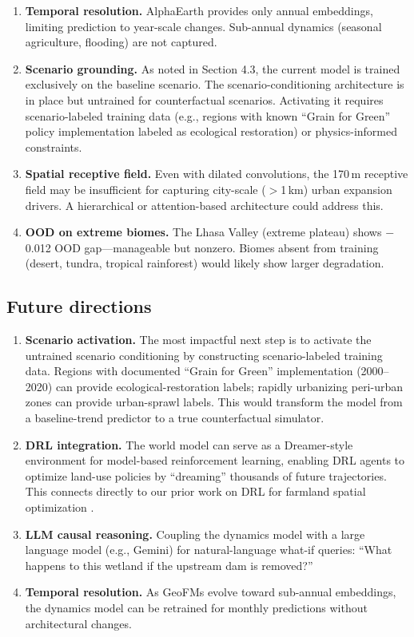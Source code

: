 \documentclass{article}
\begin{document}
\begin{enumerate}
\item \textbf{Temporal resolution.} AlphaEarth provides only annual embeddings, limiting prediction to year-scale changes. Sub-annual dynamics (seasonal agriculture, flooding) are not captured.

\item \textbf{Scenario grounding.} As noted in Section 4.3, the current model is trained exclusively on the baseline scenario. The scenario-conditioning architecture is in place but untrained for counterfactual scenarios. Activating it requires scenario-labeled training data (e.g., regions with known ``Grain for Green'' policy implementation labeled as ecological restoration) or physics-informed constraints.

\item \textbf{Spatial receptive field.} Even with dilated convolutions, the 170\,m receptive field may be insufficient for capturing city-scale ($>$1\,km) urban expansion drivers. A hierarchical or attention-based architecture could address this.

\item \textbf{OOD on extreme biomes.} The Lhasa Valley (extreme plateau) shows $-$0.012 OOD gap---manageable but nonzero. Biomes absent from training (desert, tundra, tropical rainforest) would likely show larger degradation.
\end{enumerate}

\subsection{Future directions}
\label{sec:future}

\begin{enumerate}
\item \textbf{Scenario activation.} The most impactful next step is to activate the untrained scenario conditioning by constructing scenario-labeled training data. Regions with documented ``Grain for Green'' implementation (2000--2020) can provide ecological-restoration labels; rapidly urbanizing peri-urban zones can provide urban-sprawl labels. This would transform the model from a baseline-trend predictor to a true counterfactual simulator.

\item \textbf{DRL integration.} The world model can serve as a Dreamer-style environment for model-based reinforcement learning, enabling DRL agents to optimize land-use policies by ``dreaming'' thousands of future trajectories. This connects directly to our prior work on DRL for farmland spatial optimization \citep{zhou2026drl}.

\item \textbf{LLM causal reasoning.} Coupling the dynamics model with a large language model (e.g., Gemini) for natural-language what-if queries: ``What happens to this wetland if the upstream dam is removed?''

\item \textbf{Temporal resolution.} As GeoFMs evolve toward sub-annual embeddings, the dynamics model can be retrained for monthly predictions without architectural changes.
\end{enumerate}
\end{document}

